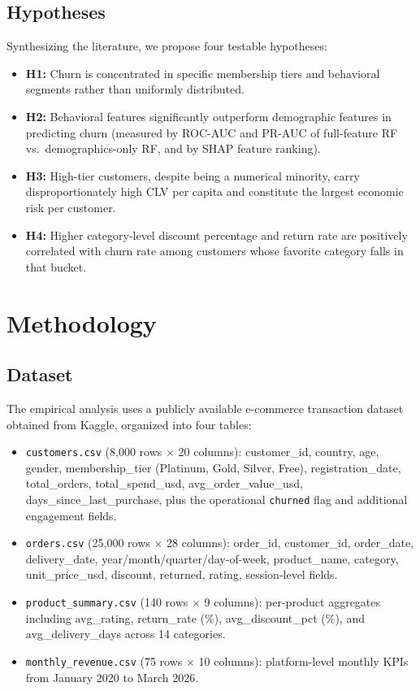 \documentclass[conference]{IEEEtran}
\begin{document}
\subsection{Hypotheses}

Synthesizing the literature, we propose four testable hypotheses:

\begin{itemize}
\item \textbf{H1:} Churn is concentrated in specific membership tiers and behavioral segments rather than uniformly distributed.
\item \textbf{H2:} Behavioral features significantly outperform demographic features in predicting churn (measured by ROC-AUC and PR-AUC of full-feature RF vs.\ demographics-only RF, and by SHAP feature ranking).
\item \textbf{H3:} High-tier customers, despite being a numerical minority, carry disproportionately high CLV per capita and constitute the largest economic risk per customer.
\item \textbf{H4:} Higher category-level discount percentage and return rate are positively correlated with churn rate among customers whose favorite category falls in that bucket.
\end{itemize}

\section{Methodology}

\subsection{Dataset}

The empirical analysis uses a publicly available e-commerce transaction dataset obtained from Kaggle, organized into four tables:

\begin{itemize}
\item \texttt{customers.csv} (8{,}000 rows $\times$ 20 columns): customer\_id, country, age, gender, membership\_tier (Platinum, Gold, Silver, Free), registration\_date, total\_orders, total\_spend\_usd, avg\_order\_value\_usd, days\_since\_last\_purchase, plus the operational \texttt{churned} flag and additional engagement fields.
\item \texttt{orders.csv} (25{,}000 rows $\times$ 28 columns): order\_id, customer\_id, order\_date, delivery\_date, year/month/quarter/day-of-week, product\_name, category, unit\_price\_usd, discount, returned, rating, session-level fields.
\item \texttt{product\_summary.csv} (140 rows $\times$ 9 columns): per-product aggregates including avg\_rating, return\_rate (\%), avg\_discount\_pct (\%), and avg\_delivery\_days across 14 categories.
\item \texttt{monthly\_revenue.csv} (75 rows $\times$ 10 columns): platform-level monthly KPIs from January 2020 to March 2026.
\end{itemize}
\end{document}
